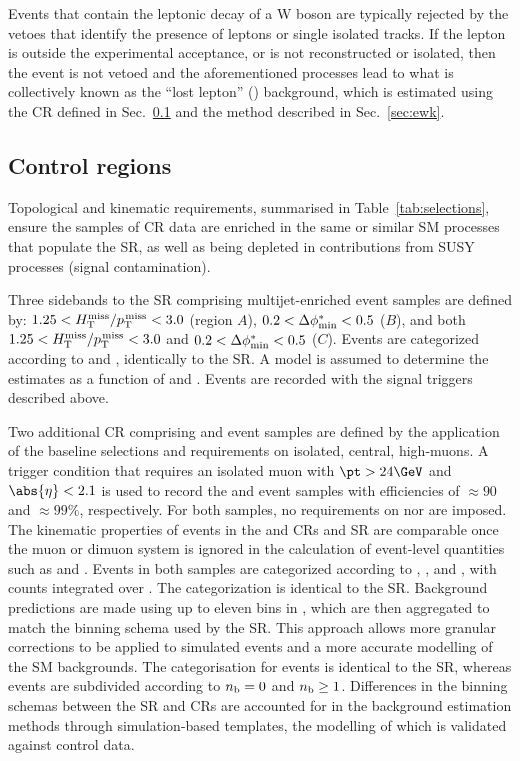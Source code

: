 Events that contain the leptonic decay of a W boson are typically
rejected by the vetoes that identify the presence of leptons or single
isolated tracks. If the lepton is outside the experimental acceptance,
or is not reconstructed or isolated, then the event is not vetoed and
the aforementioned processes lead to what is collectively known as the
``lost lepton'' (\lost) background, which is estimated using the \mj
CR defined in Sec.~\ref{sec:control} and the method described in
Sec.~\ref{sec:ewk}.


\subsection{Control regions}
\label{sec:control}

Topological and kinematic requirements, summarised in
Table~\ref{tab:selections}, ensure the samples of CR data are enriched
in the same or similar SM processes that populate the SR, as well as
being depleted in contributions from SUSY processes (signal
contamination).

Three sidebands to the SR comprising multijet-enriched event samples
are defined by: $1.25 < \mhtmet < 3.0$ (region $A$), $0.2 < \bdphi <
0.5$ ($B$), and both $1.25 < \mhtmet < 3.0$ and $0.2 < \bdphi < 0.5$
($C$). Events are categorized according to \njet and \scalht,
identically to the SR. A model is assumed to determine the estimates
as a function of \nb and \mht. Events are recorded with the signal
triggers described above.

Two additional CR comprising \mj and \mmj event samples are defined by
the application of the baseline selections and requirements on
isolated, central, high-\pt muons. A trigger condition that requires
an isolated muon with $\pt > 24\GeV$ and $\abs{\eta} < 2.1$ is used to
record the \mj and \mmj event samples with efficiencies of
${\approx}90$ and ${\approx}99\%$, respectively. For both samples, no
requirements on \alphat nor \bdphi are imposed. The kinematic
properties of events in the \mj and \mmj CRs and SR are comparable
once the muon or dimuon system is ignored in the calculation of
event-level quantities such as \scalht and \mht.  Events in both
samples are categorized according to \njet, \scalht, and \nb, with
counts integrated over \mht. The \njet categorization is identical to
the SR. Background predictions are made using up to eleven bins in
\scalht, which are then aggregated to match the \scalht binning schema
used by the SR. This approach allows more granular corrections to be
applied to simulated events and a more accurate modelling of the SM
backgrounds. The \nb categorisation for \mj events is identical to the
SR, whereas \mmj events are subdivided according to $\nb = 0$ and $\nb
\geq 1$. Differences in the binning schemas between the SR and CRs are
accounted for in the background estimation methods through
simulation-based templates, the modelling of which is validated
against control data.

